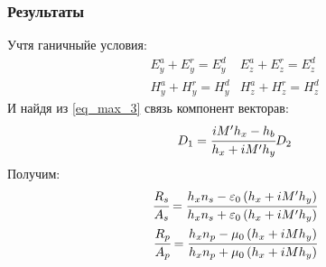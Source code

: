 \documentclass[handout]{beamer}
\newcommand{\inner}[1]{\left( #1 \right)}
\newcommand{\eps}{\varepsilon}
\begin{document}
\begin{frame}
    \frametitle{Результаты}

        Учтя ганичныйе условия:
        \begin{eqnarray*}
            E_y^a + E_y^r = E^d_y& E_z^a + E_z^r = E^d_z \\
            H_y^a + H_y^r = H_y^d& H_z^a + H_z^r = H_z^d
        \end{eqnarray*}
        И найдя из \ref{eq_max_3} связь компонент векторав:
        \begin{equation*}
            D_1 = \cfrac{iM'h_x - h_b}{h_x + iM'h_y}D_2
        \end{equation*}
        Получим:
        \begin{eqnarray}
            \cfrac{R_s}{A_s} = \cfrac{h_x n_s - \eps_0 \inner{h_x + iM'h_y}}{h_x n_s + \eps_0 \inner{h_x + iM'h_y}}\\
            \cfrac{R_p}{A_p} = \cfrac{h_x n_p - \mu_0 \inner{h_x + iMh_y}}{h_x n_p + \mu_0 \inner{h_x + iMh_y}}
        \end{eqnarray}
\end{frame}
\end{document}

